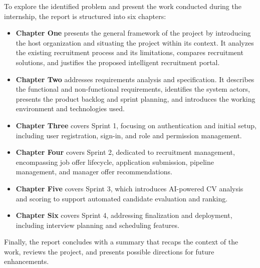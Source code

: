 \par

To explore the identified problem and present the work conducted during the internship, the report is structured into six chapters:

\begin{itemize}[label={-}]
  \item \textbf{Chapter One} presents the general framework of the project by introducing the host organization and situating the project within its context. It analyzes the existing recruitment process and its limitations, compares recruitment solutions, and justifies the proposed intelligent recruitment portal.

  \item \textbf{Chapter Two} addresses requirements analysis and specification. It describes the functional and non-functional requirements, identifies the system actors, presents the product backlog and sprint planning, and introduces the working environment and technologies used.

  \item \textbf{Chapter Three} covers Sprint 1, focusing on authentication and initial setup, including user registration, sign-in, and role and permission management.

  \item \textbf{Chapter Four} covers Sprint 2, dedicated to recruitment management, encompassing job offer lifecycle, application submission, pipeline management, and manager offer recommendations.

  \item \textbf{Chapter Five} covers Sprint 3, which introduces AI-powered CV analysis and scoring to support automated candidate evaluation and ranking.

  \item \textbf{Chapter Six} covers Sprint 4, addressing finalization and deployment, including interview planning and scheduling features.
\end{itemize}

\par

Finally, the report concludes with a summary that recaps the context of the work, reviews the project, and presents possible directions for future enhancements.
